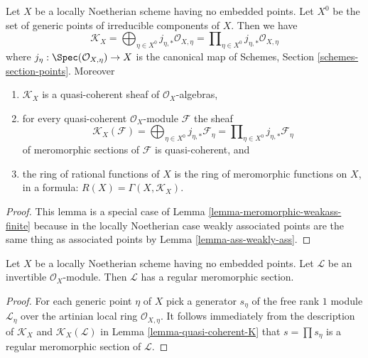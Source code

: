 \begin{lemma}
\label{lemma-quasi-coherent-K}
Let $X$ be a locally Noetherian scheme having no embedded points.
Let $X^0$ be the set of generic points of irreducible components of $X$.
Then we have
$$
\mathcal{K}_X =
\bigoplus\nolimits_{\eta \in X^0} j_{\eta, *}\mathcal{O}_{X, \eta} =
\prod\nolimits_{\eta \in X^0} j_{\eta, *}\mathcal{O}_{X, \eta}
$$
where $j_\eta : \Spec(\mathcal{O}_{X, \eta}) \to X$ is the canonical map
of Schemes, Section \ref{schemes-section-points}. Moreover
\begin{enumerate}
\item $\mathcal{K}_X$ is a quasi-coherent sheaf of $\mathcal{O}_X$-algebras,
\item for every quasi-coherent $\mathcal{O}_X$-module $\mathcal{F}$ the sheaf
$$
\mathcal{K}_X(\mathcal{F}) =
\bigoplus\nolimits_{\eta \in X^0} j_{\eta, *}\mathcal{F}_\eta =
\prod\nolimits_{\eta \in X^0} j_{\eta, *}\mathcal{F}_\eta
$$
of meromorphic sections of $\mathcal{F}$ is quasi-coherent, and
\item the ring of rational functions of $X$ is the ring of meromorphic
functions on $X$, in a formula: $R(X) = \Gamma(X, \mathcal{K}_X)$.
\end{enumerate}
\end{lemma}

\begin{proof}
This lemma is a special case of
Lemma \ref{lemma-meromorphic-weakass-finite}
because in the locally Noetherian case
weakly associated points are the same thing
as associated points by Lemma \ref{lemma-ass-weakly-ass}.
\end{proof}

\begin{lemma}
\label{lemma-regular-meromorphic-section-exists-noetherian}
Let $X$ be a locally Noetherian scheme having no embedded points.
Let $\mathcal{L}$ be an invertible $\mathcal{O}_X$-module.
Then $\mathcal{L}$ has a regular meromorphic section.
\end{lemma}

\begin{proof}
For each generic point $\eta$ of $X$ pick a generator
$s_\eta$ of the free rank $1$ module $\mathcal{L}_\eta$
over the artinian local ring $\mathcal{O}_{X, \eta}$.
It follows immediately from the description of
$\mathcal{K}_X$ and $\mathcal{K}_X(\mathcal{L})$ in
Lemma \ref{lemma-quasi-coherent-K} that $s = \prod s_\eta$
is a regular meromorphic section of $\mathcal{L}$.
\end{proof}


